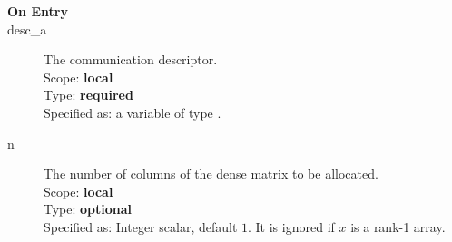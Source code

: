 


%
%


\begin{description}
\item[\bf On Entry]
\item[desc\_a] The communication descriptor.\\
Scope: {\bf local} \\
Type: {\bf required}\\
Specified as: a variable of type \descdata.\\
\item[n] The number of columns of the dense matrix to be allocated.\\
Scope: {\bf local} \\
Type: {\bf optional}\\
Specified as: Integer scalar, default $1$. It is ignored if $x$ is a
rank-1 array. 
\end{description}

